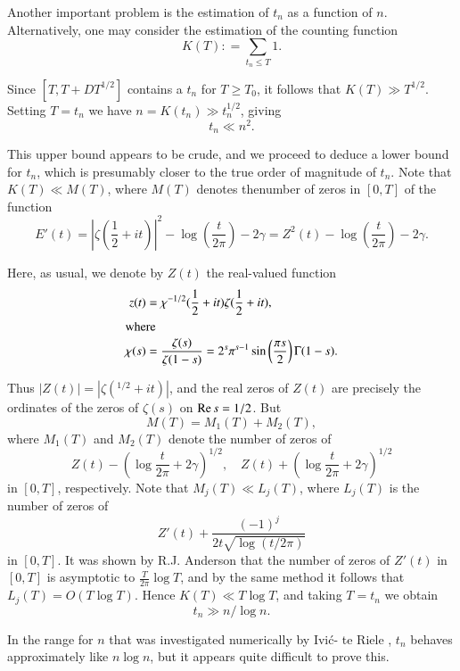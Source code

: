 Another important problem is the estimation of $t_n$ as a function of
$n$. Alternatively, one may consider the estimation of the counting
function
$$
K(T) : = \sum_{t_n \leq T}1.
$$

Since $[T, T+ DT^{1/2}]$ contains a $t_n$ for $T \geq T_0$, it follows
that $K(T) \gg T^{1/2}$. Setting $T= t_n$ we have $n= K(t_n) \gg
t_n^{1/2}$, giving 
\begin{equation}
  t_n \ll n^2.\label{c3:eq3.73}
\end{equation}

This upper bound appears to be crude, and we proceed to deduce a lower
bound for $t_n$, which is presumably closer to the true order of
magnitude of $t_n$. Note that $K(T)\ll M(T)$, where $M(T)$ denotes
the\pageoriginale number of zeros in $[0, T]$ of the function
$$
E' (t) = \left|\zeta \left( \frac{1}{2} + it\right)\right|^2 - \log
\left(\frac{t}{2 \pi} 
\right)- 2 \gamma = Z^2 (t) - \log \left(\frac{t}{2 \pi} \right)- 2 \gamma.
$$

Here, as usual, we denote by $Z(t)$ the real-valued function
\begin{align*}
  z(t) & = \chi ^{-1/2}( \frac{1}{2} + it) \zeta (\frac{1}{2} + it),\\
  \intertext{where}
  \chi(s) & = \frac{\zeta(s)}{\zeta(1- s)} = 2^{s} \pi^{s-1} \sin
  \left( \frac{\pi s}{2}\right) \Gamma (1-s).
\end{align*}

Thus $|Z(t)| = |\zeta ({}^{1/2} + it)|$, and the real zeros of $Z(t)$
are precisely the ordinates of the zeros of $\zeta(s)$ on $\operatorname{Re} s=
1/2$. But
$$
M(T) = M_1(T) + M_2 (T),
$$
where $M_1(T)$ and $M_2(T)$ denote the number of zeros of 
$$
Z(t) - \left(\log \frac{t}{2 \pi} + 2 \gamma \right)^{1/2},\quad Z(t) +
\left(\log \frac{t}{2 \pi} + 2 \gamma \right)^{1/2}
$$
in $[0, T]$, respectively. Note that $M_j (T) \ll L_j (T)$, where
$L_j(T)$ is the number of zeros of 
$$
Z'(t) + \frac{(-1)^j}{2t \sqrt{\log (t/2 \pi)}}
$$
in $[0, T]$. It was shown by R.J. Anderson \cite{Anderson1} that the number of
zeros of $Z'(t)$ in $[0, T]$ is asymptotic to $\frac{T}{2 \pi} \log
T$, and by the same method it follows that $L_j (T)= O(T \log
T)$. Hence $K(T) \ll T \log T$, and taking $T= t_n$ we obtain
\begin{equation}
  t_n \gg n/\log n.\label{c3:eq3.74}
\end{equation}

In the range for $n$ that was investigated numerically by Ivi\'c- te
Riele \cite{Ivic1}, $t_n$ behaves approximately like $n \log n$, but it
appears quite difficult to prove this.

